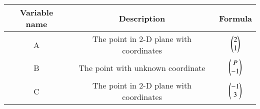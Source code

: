 \begin{center}
	\begin{tabular}{|c|c|c|}
    \hline
    \textbf{Variable name} & \textbf{Description} & \textbf{Formula}\\ 
    \hline
		A  & The point in 2-D plane with coordinates & $\begin{pmatrix}2\\ 1\end{pmatrix}$ \\
    \hline 
		B  & The point with unknown coordinate  & $\begin{pmatrix}P \\ -1\end{pmatrix}$ \\
    \hline
		C  & The point in 2-D plane with coordinates & $\begin{pmatrix}-1\\3\end{pmatrix}$ \\
    \hline   
    \end{tabular}
\end{center}
